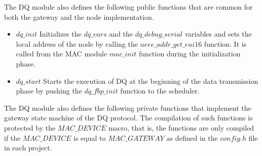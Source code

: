 The DQ module also defines the following public functions that are common for both the gateway and the node implementation.
\begin{itemize}
\item $dq\_init$ Initializes the $dq\_vars$ and the $dq\_debug\_serial$ variables and sets the local address of the node by calling the $ueee\_addr\_get\_eui16$ function. It is called from the MAC module $mac\_init$ function during the initialization phase.
\item $dq\_start$ Starts the execution of DQ at the beginning of the data transmission phase by pushing the $dq\_fbp\_init$ function to the scheduler.
\end{itemize}

The DQ module also defines the following private functions that implement the gateway state machine of the DQ protocol. The compilation of such functions is protected by the $MAC\_DEVICE$ macro, that is, the functions are only compiled if the $MAC\_DEVICE$ is equal to $MAC\_GATEWAY$ as defined in the $config.h$ file in each project.
